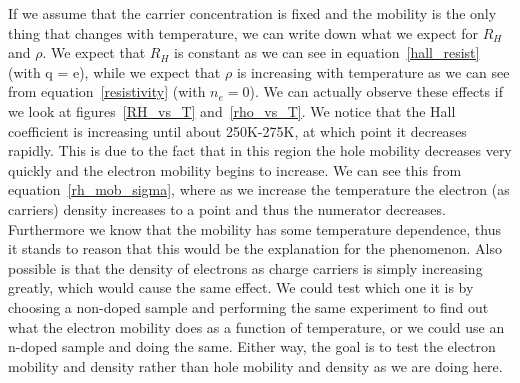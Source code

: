 \documentclass[reprint, nobibnotes, amssymb, amsmath, amsfonts, physics, mathtools, mathrsfs, floatfix]{revtex4-1}
\begin{document}
    If we assume that the carrier concentration is fixed and the mobility is the only thing that changes with temperature, we can write down what we expect for $R_H$ and $\rho$.  We expect that $R_H$ is constant as we can see in equation~\ref{hall_resist} (with q = e), while we expect that $\rho$ is increasing with temperature as we can see from equation~\ref{resistivity} (with $n_e = 0$).  We can actually observe these effects if we look at figures~\ref{RH_vs_T} and~\ref{rho_vs_T}.  We notice that the Hall coefficient is increasing until about 250K-275K, at which point it decreases rapidly.  This is due to the fact that in this region the hole mobility decreases very quickly and the electron mobility begins to increase.  We can see this from equation~\ref{rh_mob_sigma}, where as we increase the temperature the electron (as carriers) density increases to a point and thus the numerator decreases. Furthermore we know that the mobility has some temperature dependence, thus it stands to reason that this would be the explanation for the phenomenon.  Also possible is that the density of electrons as charge carriers is simply increasing greatly, which would cause the same effect.  We could test which one it is by choosing a non-doped sample and performing the same experiment to find out what the electron mobility does as a function of temperature, or we could use an n-doped sample and doing the same.  Either way, the goal is to test the electron mobility and density rather than hole mobility and density as we are doing here.
\end{document}

